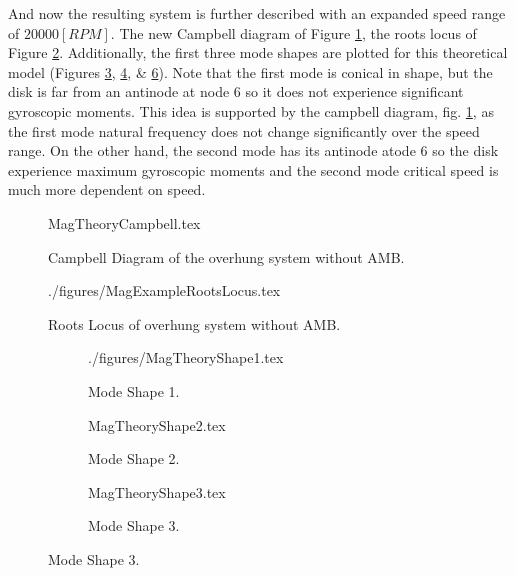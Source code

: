 And now the resulting system is further described with an expanded speed range of $ 20000[RPM] $. The new Campbell diagram of Figure \ref{fig:MagTheoryCampbell}, the roots locus of Figure \ref{fig:MagTheoryRootLocus}. Additionally, the first three mode shapes are plotted for this theoretical model (Figures \ref{fig:MagTheoryShape1}, \ref{fig:MagTheoryShape2}, \& \ref{fig:MagTheoryShape3}). Note that the first mode is conical in shape, but the disk is far from an antinode at node 6 so it does not experience significant gyroscopic moments. This idea is supported by the campbell diagram, fig. \ref{fig:MagTheoryCampbell}, as the first mode natural frequency does not change significantly over the speed range. On the other hand, the second mode has its antinode atode 6 so the disk experience maximum gyroscopic moments and the second mode critical speed is much more dependent on speed.
\begin{figure}[!htb]
	\def\width{.6\linewidth}
	\def\height{.4\linewidth}
	\def\sep{3em}
	\centering
	{MagTheoryCampbell.tex}
	\caption{Campbell Diagram of the overhung system without AMB.}
	\label{fig:MagTheoryCampbell}
\end{figure}
\begin{figure}[!htb]
	\def\width{.6\linewidth}
	\def\height{.4\linewidth}
	\def\sep{3em}
	\centering
	{./figures/MagExampleRootsLocus.tex}
	\caption{Roots Locus of overhung system without AMB.}
	\label{fig:MagTheoryRootLocus}
\end{figure}
\begin{figure}
	\def\cs{.29}
	\begin{subfigure}{\cs\textwidth}
		\centering
		\def\width{\linewidth}
		\def\height{\linewidth}
		{./figures/MagTheoryShape1.tex}
		\caption{Mode Shape 1.}
		\label{fig:MagTheoryShape1}
	\end{subfigure}
	\begin{subfigure}{\cs\textwidth}
		\centering
		\def\width{\linewidth}
		\def\height{\linewidth}
		{MagTheoryShape2.tex}
		\caption{Mode Shape 2.}
		\label{fig:MagTheoryShape2}
	\end{subfigure}
	\begin{subfigure}{\cs\textwidth}
		\centering
		\def\width{\linewidth}
		\def\height{\linewidth}
		{MagTheoryShape3.tex}
		\caption{Mode Shape 3.}
		\label{fig:MagTheoryShape3}
	\end{subfigure}
\end{figure}
